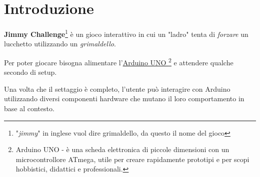 \chapter{Introduzione}
\textbf{Jimmy Challenge}\footnote{"\textit{jimmy}" in inglese vuol dire grimaldello, da questo il nome del gioco} è un gioco interattivo in cui un "ladro" tenta di \textit{forzare} un lucchetto utilizzando un \textit{grimaldello}. 

Per poter giocare bisogna alimentare l'\href{https://it.wikipedia.org/wiki/Wiring}{Arduino UNO \footnote{Arduino UNO - è una scheda elettronica di piccole dimensioni con un microcontrollore ATmega, utile per creare rapidamente prototipi e per scopi hobbistici, didattici e professionali.}} e attendere qualche secondo di setup.

Una volta che il settaggio è completo, l'utente può interagire con Arduino utilizzando diversi componenti hardware che mutano il loro comportamento in base al contesto.




